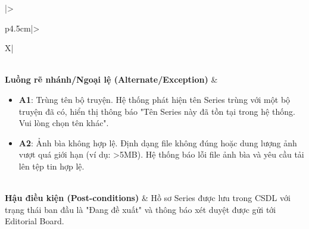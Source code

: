 \begin{table}[H]
\begin{tabularx}{\textwidth}{|>{\raggedright\arraybackslash\bfseries}p{4.5cm}|>{\raggedright\arraybackslash}X|}
\begin{minipage}[t]{\linewidth}
\begin{enumerate}[leftmargin=*]
    \end{enumerate}
\end{minipage} \\ \hline
\textbf{Luồng rẽ nhánh/Ngoại lệ (Alternate/Exception)} & 
\begin{minipage}[t]{\linewidth}
    \begin{itemize}[leftmargin=*]
        \item \textbf{A1}: Trùng tên bộ truyện. Hệ thống phát hiện tên Series trùng với một bộ truyện đã có, hiển thị thông báo "Tên Series này đã tồn tại trong hệ thống. Vui lòng chọn tên khác".
        \item \textbf{A2}: Ảnh bìa không hợp lệ. Định dạng file không đúng hoặc dung lượng ảnh vượt quá giới hạn (ví dụ: >5MB). Hệ thống báo lỗi file ảnh bìa và yêu cầu tải lên tệp tin hợp lệ.
    \end{itemize}
\end{minipage} \\ \hline
\textbf{Hậu điều kiện (Post-conditions)} & Hồ sơ Series được lưu trong CSDL với trạng thái ban đầu là "Đang đề xuất" và thông báo xét duyệt được gửi tới Editorial Board. \\ \hline
\end{tabularx}
\caption{Đặc tả UC-07: Tạo hồ sơ Series mới}
\label{tab:uc07}
\end{table}

